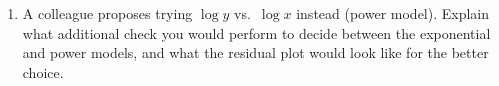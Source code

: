 \documentclass[10pt]{article}
\begin{document}
\begin{tcolorbox}[colback=white, colframe=black!40, boxrule=0.8pt, arc=2mm,
    left=4mm, right=4mm, top=3mm, bottom=3mm,
    title={\textbf{Tier E --- Extension}}, fonttitle=\bfseries, halign title=center]
\begin{enumerate}[leftmargin=1.6em, itemsep=0.18in]
  \item A colleague proposes trying $\log y$ vs.\ $\log x$ instead (power model).
        Explain what additional check you would perform to decide between the exponential
        and power models, and what the residual plot would look like for the better choice.\\[8pt]
        \writeline\\[3pt]\writeline\\[3pt]\writeline

\end{enumerate}
\end{tcolorbox}
\end{document}
